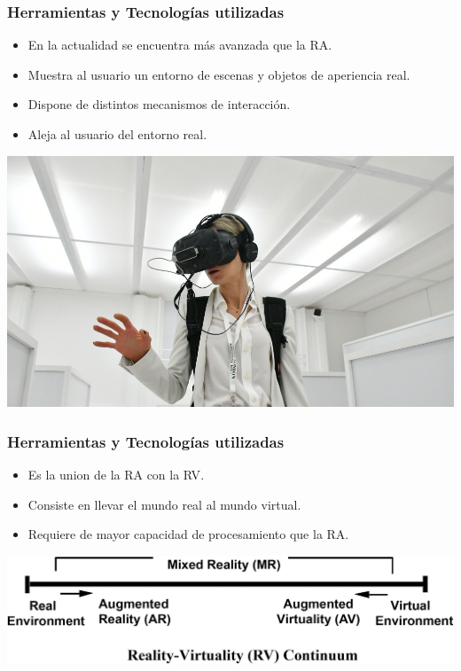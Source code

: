 \begin{frame}
	\frametitle{Herramientas y Tecnologías utilizadas}
			\begin{itemize}
				\item {En la actualidad se encuentra más avanzada que la RA.}
				\item {Muestra al usuario un entorno de escenas y objetos de aperiencia real.}
				\item {Dispone de distintos mecanismos de interacción.}
				\item {Aleja al usuario del entorno real.}
			\end{itemize}
		\endblock{}
			\begin{center}
				\includegraphics[width=0.50\linewidth]{Images/vr1}
			\end{center}
\end{frame}



\begin{frame}
	\frametitle{Herramientas y Tecnologías utilizadas}
			\begin{itemize}
				\item {Es la union de la RA con la RV}.
				\item {Consiste en llevar el mundo real al mundo virtual.}
				\item {Requiere de mayor capacidad de procesamiento que la RA.}
			\end{itemize}
		\endblock{}
		\vfill 
			\begin{center}
				\includegraphics[width=0.8\linewidth]{Images/realidamixta}
			\end{center}
\end{frame}


